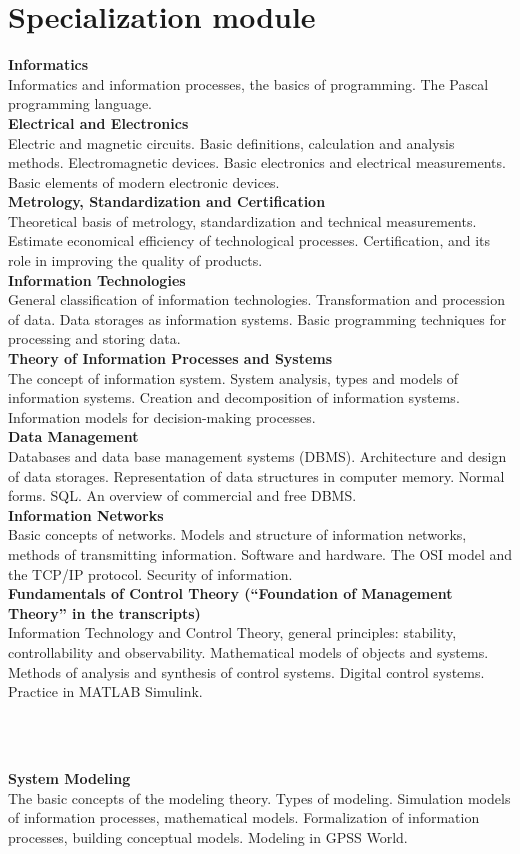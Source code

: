 \documentclass[a4paper, 12pt]{article}
\newcommand{\group}[1] {\section{#1}}
\newcommand{\discipline}[1] {\textbf{#1} \\ }
\newcommand{\desc}[1] { #1 \\ }
\begin{document}
\group{Specialization module}

\discipline{Informatics}
\desc{Informatics and information processes, the basics of programming. The Pascal programming language.}

\discipline{Electrical and Electronics}
\desc{Electric and magnetic circuits. Basic definitions, calculation and analysis methods. Electromagnetic devices. Basic electronics and electrical measurements. Basic elements of modern electronic devices.}

\discipline{Metrology, Standardization and Certification}
\desc{Theoretical basis of metrology, standardization and technical measurements. Estimate economical efficiency of technological processes. Certification, and its role in improving the quality of products.}

\discipline{Information Technologies}
\desc{General classification of information technologies. Transformation and procession of data. Data storages as information systems. Basic programming techniques for processing and storing data.}

\discipline{Theory of Information Processes and Systems}
\desc{The concept of information system. System analysis, types and models of information systems. Creation and decomposition of information systems. Information models for decision-making processes.}

\discipline{Data Management}
\desc{Databases and data base management systems (DBMS). Architecture and design of data storages. Representation of data structures in computer memory. Normal forms. SQL. An overview of commercial and free DBMS.}

\discipline{Information Networks}
\desc{Basic concepts of networks. Models and structure of information networks, methods of transmitting information. Software and hardware. The OSI model and the TCP/IP protocol. Security of information.}

\discipline{Fundamentals of Control Theory (``Foundation of Management Theory'' in the transcripts)}
\desc{Information Technology and Control Theory, general principles: stability, controllability and observability. Mathematical models of objects and systems. Methods of analysis and synthesis of control systems. Digital control systems. Practice in MATLAB Simulink.}

\

\

\discipline{System Modeling}
\desc{The basic concepts of the modeling theory. Types of modeling. Simulation models of information processes, mathematical models. Formalization of information processes, building conceptual models. Modeling in GPSS World.}
\end{document}
